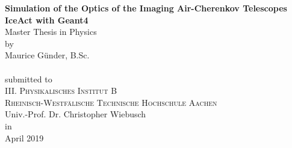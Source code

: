 \begin{titlepage}
\addtolength{\oddsidemargin}{4mm}
\begin{center}

\LARGE
\textbf{Simulation of the Optics of the Imaging Air-Cherenkov Telescopes IceAct with Geant4} \\[15mm]

\large
Master Thesis in Physics\\[15mm]

{\large by}\\[1mm]
\LARGE
Maurice Günder, B.Sc.\\[43mm]%

{\color{red}}\\[43mm]

{\large submitted to}\\[1mm]
\large
\textsc{III. Physikalisches Institut B \\Rheinisch-Westfälische Technische Hochschule Aachen}\\
Univ.-Prof. Dr. Christopher Wiebusch\\[25mm]

{\large in}\\[1mm]
\large
April 2019

\end{center}
\end{titlepage}